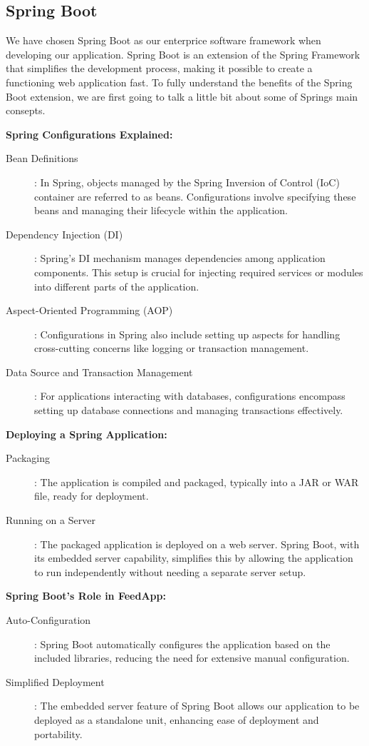 \subsection{Spring Boot}
\label{subsec:springboot}
We have chosen Spring Boot as our enterprice software framework when developing our application. Spring Boot is an extension of the Spring Framework that simplifies the development process, making it possible to create a functioning web application fast. To fully understand the benefits of the Spring Boot extension, we are first going to talk a little bit about some of Springs main consepts.  

\textbf{Spring Configurations Explained:}
\begin{description}
    \item[Bean Definitions]: In Spring, objects managed by the Spring Inversion of Control (IoC) container are referred to as beans. Configurations involve specifying these beans and managing their lifecycle within the application.
    \item[Dependency Injection (DI)]: Spring's DI mechanism manages dependencies among application components. This setup is crucial for injecting required services or modules into different parts of the application.
    \item[Aspect-Oriented Programming (AOP)]: Configurations in Spring also include setting up aspects for handling cross-cutting concerns like logging or transaction management.
    \item[Data Source and Transaction Management]: For applications interacting with databases, configurations encompass setting up database connections and managing transactions effectively.
\end{description}

\textbf{Deploying a Spring Application:}
\begin{description}
    \item[Packaging]: The application is compiled and packaged, typically into a JAR or WAR file, ready for deployment.
    \item[Running on a Server]: The packaged application is deployed on a web server. Spring Boot, with its embedded server capability, simplifies this by allowing the application to run independently without needing a separate server setup.
\end{description}

\textbf{Spring Boot's Role in FeedApp:}
\begin{description}
    \item[Auto-Configuration]: Spring Boot automatically configures the application based on the included libraries, reducing the need for extensive manual configuration.
    \item[Simplified Deployment]: The embedded server feature of Spring Boot allows our application to be deployed as a standalone unit, enhancing ease of deployment and portability.
\end{description}

